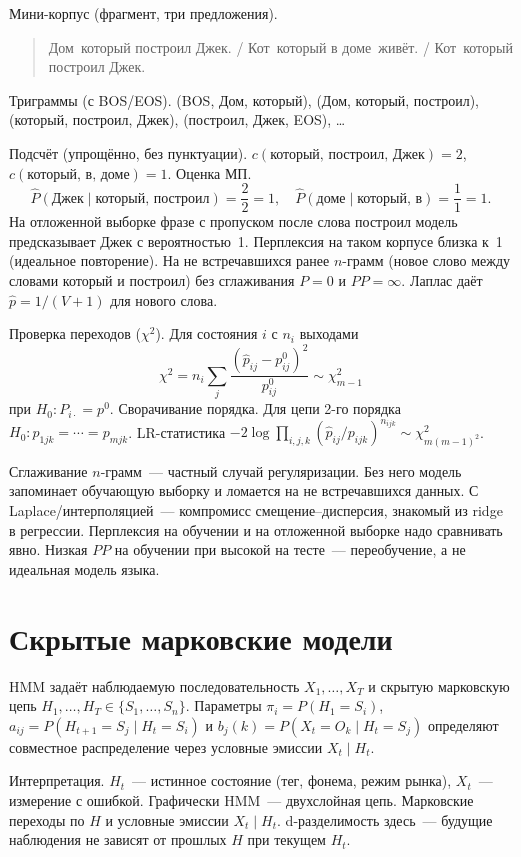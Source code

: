 Мини-корпус (фрагмент, три предложения).
\begin{quote}
\small
Дом\, который построил Джек. / Кот\, который в доме\, живёт. / Кот\, который построил Джек.
\end{quote}
Триграммы (с BOS/EOS). (BOS, Дом, который), (Дом, который, построил), (который, построил, Джек), (построил, Джек, EOS), \ldots

Подсчёт (упрощённо, без пунктуации). $c(\text{который, построил, Джек})=2$, $c(\text{который, в, доме})=1$. Оценка МП.
\[ \hat P(\text{Джек}\mid\text{который, построил})= \frac{2}{2}=1, \quad \hat P(\text{доме}\mid\text{который, в})=\frac{1}{1}=1.
\]
На отложенной выборке фразе с пропуском после слова построил модель предсказывает Джек с вероятностью~1. Перплексия на таком корпусе близка к~1 (идеальное повторение).
На не встречавшихся ранее $n$-грамм (новое слово между словами который и построил) без сглаживания $P=0$ и $PP=\infty$. Лаплас даёт $\hat p = 1/(V+1)$ для нового слова.

Проверка переходов ($\chi^2$). Для состояния $i$ с $n_i$ выходами
\[ \chi^2 = n_i\sum_j \frac{(\hat p_{ij}-p^0_{ij})^2}{p^0_{ij}} \sim \chi^2_{m-1}
\]
при $H_0\colon P_{i\cdot}=p^0$.
Сворачивание порядка. Для цепи 2-го порядка $H_0\colon p_{1jk}=\cdots=p_{mjk}$. LR-статистика $-2\log\prod_{i,j,k}(\hat p_{ij}/p_{ijk})^{n_{ijk}}\sim\chi^2_{m(m-1)^2}$.

Сглаживание $n$-грамм~--- частный случай регуляризации. Без него модель запоминает обучающую выборку и ломается на не встречавшихся данных. С Laplace/интерполяцией~--- компромисс смещение--дисперсия, знакомый из ridge в регрессии.
Перплексия на обучении и на отложенной выборке надо сравнивать явно. Низкая $PP$ на обучении при высокой на тесте~--- переобучение, а не идеальная модель языка.

\section{Скрытые марковские модели}

\begin{definition}
HMM задаёт наблюдаемую последовательность $X_1,\ldots,X_T$ и скрытую марковскую цепь $H_1,\ldots,H_T\in\{S_1,\ldots,S_n\}$.
Параметры $\pi_i=P(H_1=S_i)$, $a_{ij}=P(H_{t+1}=S_j\mid H_t=S_i)$ и $b_j(k)=P(X_t=O_k\mid H_t=S_j)$ определяют совместное распределение через условные эмиссии $X_t\mid H_t$.
\end{definition}

Интерпретация. $H_t$~--- истинное состояние (тег, фонема, режим рынка), $X_t$~--- измерение с ошибкой.
Графически HMM~--- двухслойная цепь. Марковские переходы по $H$ и условные эмиссии $X_t\mid H_t$. d-разделимость здесь~--- будущие наблюдения не зависят от прошлых $H$ при текущем $H_t$.

